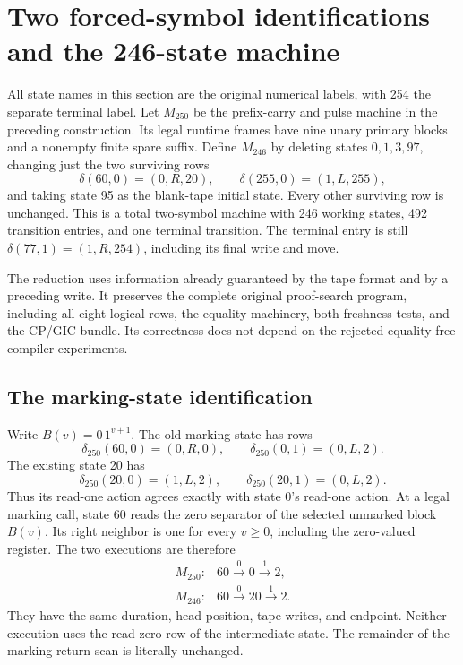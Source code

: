 \section{Two forced-symbol identifications and the 246-state machine}
\label{sec:forced246}

All state names in this section are the original numerical labels, with
254 the separate terminal label.  Let $M_{250}$ be the prefix-carry and
pulse machine in the preceding construction.  Its legal runtime frames
have nine unary primary blocks and a nonempty finite spare suffix.  Define
$M_{246}$ by deleting states $0,1,3,97$, changing just the two surviving rows
\[
 \delta(60,0)=(0,R,20),\qquad
 \delta(255,0)=(1,L,255),
\]
and taking state 95 as the blank-tape initial state.  Every other surviving
row is unchanged.  This is a total two-symbol machine with 246 working
states, 492 transition entries, and one terminal transition.  The terminal
entry is still $\delta(77,1)=(1,R,254)$, including its final write and move.

The reduction uses information already guaranteed by the tape format and
by a preceding write.  It preserves the complete original proof-search
program, including all eight logical rows, the equality machinery, both
freshness tests, and the CP/GIC bundle.  Its correctness does not depend on
the rejected equality-free compiler experiments.

\subsection{The marking-state identification}

Write $B(v)=0\,1^{v+1}$.  The old marking state has rows
\[
 \delta_{250}(60,0)=(0,R,0),\qquad
 \delta_{250}(0,1)=(0,L,2).
\]
The existing state 20 has
\[
 \delta_{250}(20,0)=(1,L,2),\qquad
 \delta_{250}(20,1)=(0,L,2).
\]
Thus its read-one action agrees exactly with state 0's read-one action.
At a legal marking call, state 60 reads the zero separator of the selected
unmarked block $B(v)$.  Its right neighbor is one for every $v\geq0$,
including the zero-valued register.  The two executions are therefore
\[
 \begin{array}{rcl}
 M_{250}:&60\xrightarrow{0}0\xrightarrow{1}2,\\
 M_{246}:&60\xrightarrow{0}20\xrightarrow{1}2.
 \end{array}
\]
They have the same duration, head position, tape writes, and endpoint.
Neither execution uses the read-zero row of the intermediate state.
The remainder of the marking return scan is literally unchanged.

